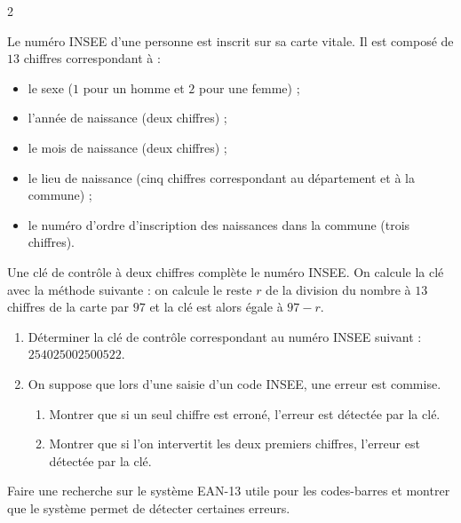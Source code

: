 \documentclass[a4paper,12pt]{article}
\begin{document}
\begin{multicols}{2}
    \begin{exercice}[title=Exercice 31 $\quad \star \star \star \quad$ { [Modéliser, Chercher] }]{}{}
    Le numéro INSEE d’une personne est inscrit sur sa carte vitale. Il est composé de $13$ chiffres correspondant à :
    \begin{itemize}
        \item le sexe ($1$ pour un homme et $2$ pour une femme) ;
        \item l’année de naissance (deux chiffres) ;
        \item le mois de naissance (deux chiffres) ;
        \item le lieu de naissance (cinq chiffres correspondant au département et à la commune) ;
        \item le numéro d’ordre d’inscription des naissances dans la commune (trois chiffres).
    \end{itemize}
    Une clé de contrôle à deux chiffres complète le numéro INSEE. On calcule la clé avec la méthode suivante : on calcule le reste $r$ de la division du nombre à $13$ chiffres de la carte par $97$ et la clé est alors égale à $97 - r$.
    \begin{enumerate}
        \item Déterminer la clé de contrôle correspondant au numéro INSEE suivant : $254025002500522$.
        \item On suppose que lors d’une saisie d’un code INSEE, une erreur est commise.
        \begin{enumerate}
            \item Montrer que si un seul chiffre est erroné, l’erreur est détectée par la clé.
            \item Montrer que si l’on intervertit les deux premiers chiffres, l’erreur est détectée par la clé.
        \end{enumerate}
    \end{enumerate}
    \end{exercice}    

    \begin{exercice}[title=Exercice 32 $\quad \star \star \star \quad$ { [Modéliser, Chercher, Communiquer] }]{}{}
    Faire une recherche sur le système EAN-13 utile pour les codes-barres et montrer que le système permet de détecter certaines erreurs.
    \end{exercice}

\end{multicols}
\end{document}

